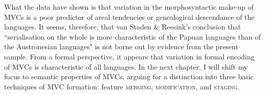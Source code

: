 What the data have shown is that variation in the morphosyntactic make-up of MVCs is a poor predictor of areal tendencies or genealogical descendance of the languages. It seems, therefore, that van Staden \& Reesink's conclusion that ``serialisation on the whole is more characteristic of the Papuan languages than of the Austronesian languages" \citep[50]{vanstaden2008serial} is not borne out by evidence from the present sample. From a formal perspective, it appears that variation in formal encoding of MVCs is characteristic of all languages. In the next chapter, I will shift my focus to semantic properties of MVCs, arguing for a distinction into three basic techniques of MVC formation: feature \textsc{merging}, \textsc{modification}, and \textsc{staging}.
